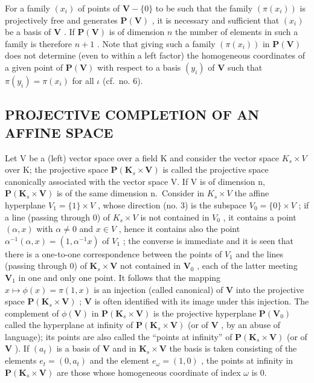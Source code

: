 For a family \((x_{i})\) of points of \(\mathbf{V} - \{0\}\) to be such that the family \((\pi (x_{i}))\) is projectively free and generates \(\mathbf{P}(\mathbf{V})\) , it is necessary and sufficient that \((x_{i})\) be a basis of \(\mathbf{V}\) . If \(\mathbf{P}(\mathbf{V})\) is of dimension \(n\) the number of elements in such a family is therefore \(n + 1\) . Note that giving such a family \((\pi (x_{i}))\) in \(\mathbf{P}(\mathbf{V})\) does not determine (even to within a left factor) the homogeneous coordinates of a given point of \(\mathbf{P}(\mathbf{V})\) with respect to a basis \((y_{i})\) of \(\mathbf{V}\) such that \(\pi (y_{i}) = \pi (x_{i})\) for all \(\iota\) (cf.~no. 6).

\subsection{PROJECTIVE COMPLETION OF AN AFFINE SPACE}

Let V be a (left) vector space over a field K and consider the vector space \(K_{s} \times V\) over K; the projective space \(\mathbf{P}(\mathbf{K}_{s} \times \mathbf{V})\) is called the projective space canonically associated with the vector space V. If V is of dimension n, \(\mathbf{P}(\mathbf{K}_{s} \times \mathbf{V})\) is of the same dimension n.~Consider in \(K_{s} \times V\) the affine hyperplane \(V_{1} = \{1\} \times V\) , whose direction (no. 3) is the subspace \(V_{0} = \{0\} \times V\) ; if a line (passing through 0) of \(K_{s} \times V\) is not contained in \(V_{0}\) , it contains a point \((\alpha, x)\) with \(\alpha \neq 0\) and \(x \in V\) , hence it contains also the point \(\alpha^{-1}(\alpha, x) = (1, \alpha^{-1}x)\) of \(V_{1}\) ; the converse is immediate and it is seen that there is a one-to-one correspondence between the points of \(V_{1}\) and the lines (passing through 0) of \(\mathbf{K}_s \times \mathbf{V}\) not contained in \(\mathbf{V}_0\) , each of the latter meeting \(\mathbf{V}_1\) in one and only one point. It follows that the mapping \(x \mapsto \phi(x) = \pi(1, x)\) is an injection (called canonical) of \(\mathbf{V}\) into the projective space \(\mathbf{P}(\mathbf{K}_s \times \mathbf{V})\) ; \(\mathbf{V}\) is often identified with its image under this injection. The complement of \(\phi(\mathbf{V})\) in \(\mathbf{P}(\mathbf{K}_s \times \mathbf{V})\) is the projective hyperplane \(\mathbf{P}(\mathbf{V}_0)\) called the hyperplane at infinity of \(\mathbf{P}(\mathbf{K}_s \times \mathbf{V})\) (or of \(\mathbf{V}\) , by an abuse of language); its points are also called the ``points at infinity'' of \(\mathbf{P}(\mathbf{K}_s \times \mathbf{V})\) (or of \(\mathbf{V}\) ). If \((a_t)\) is a basis of \(\mathbf{V}\) and in \(\mathbf{K}_s \times \mathbf{V}\) the basis is taken consisting of the elements \(e_t = (0, a_t)\) and the element \(e_\omega = (1, 0)\) , the points at infinity in \(\mathbf{P}(\mathbf{K}_s \times \mathbf{V})\) are those whose homogeneous coordinate of index \(\omega\) is 0.

